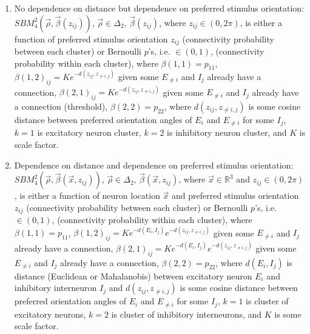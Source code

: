 \documentclass[12pt]{iopart}
\begin{document}
\begin{enumerate}
\item No dependence on distance but dependence on preferred stimulus orientation:  $SBM_{4}^{2}(\vec{\rho},\vec{\beta}(z_{ij}))$, $\vec{\rho}\in\Delta_{2}$, $\vec{\beta}(z_{ij})$, where $z_{ij}\in(0,2\pi)$, is either a function of preferred stimulus orientation $z_{ij}$ (connectivity probability between each cluster) or Bernoulli $p$'s, i.e. $\in(0,1)$, (connectivity probability within each cluster), where $\beta(1,1) = p_{11}$, $\beta(1,2)_{ij} = Ke^{-d(z_{ij},z_{\neq i,j})}$ given some $E_{\neq i}$ and $I_j$ already have a connection, $\beta(2,1)_{ij} = Ke^{-d(z_{ij},z_{\neq i,j})}$ given some $E_{\neq i}$ and $I_j$ already have a connection (threshold), $\beta(2,2) = p_{22}$, where $d(z_{ij},z_{\neq i,j})$ is some cosine distance between preferred orientation angles of $E_i$ and $E_{\neq i}$ for some $I_j$, $k=1$ is excitatory neuron cluster, $k=2$ is inhibitory neuron cluster, and $K$ is scale factor.
\item Dependence on distance and dependence on preferred stimulus orientation:  $SBM_{4}^{2}(\vec{\rho},\vec{\beta}(\vec{x},z_{ij}))$, $\vec{\rho}\in\Delta_{2}$, $\vec{\beta}(\vec{x},z_{ij})$,  where $\vec{x}\in\mathbb{R}^3$ and $z_{ij}\in(0,2\pi)$, is either a function of neuron location $\vec{x}$ and preferred stimulus orientation $z_{ij}$ (connectivity probability between each cluster) or Bernoulli $p$'s, i.e. $\in(0,1)$, (connectivity probability within each cluster), where $\beta(1,1) = p_{11}$, $\beta(1,2)_{ij} = Ke^{-d(E_i,I_j)}e^{-d(z_{ij},z_{\neq i,j})}$ given some $E_{\neq i}$ and $I_j$ already have a connection, $\beta(2,1)_{ij} = Ke^{-d(E_i,I_j)}e^{-d(z_{ij},z_{\neq i,j})}$ given some $E_{\neq i}$ and $I_j$ already have a connection, $\beta(2,2) = p_{22}$, where $d(E_i,I_j)$ is distance (Euclidean or Mahalanobis) between excitatory neuron $E_i$ and inhibitory interneuron $I_j$ and $d(z_{ij},z_{\neq i,j})$ is some cosine distance between preferred orientation angles of $E_i$ and $E_{\neq i}$ for some $I_j$, $k=1$ is cluster of excitatory neurons, $k=2$ is cluster of inhibitory interneurons, and $K$ is some scale factor.
\newline
\end{enumerate}
\end{document}
